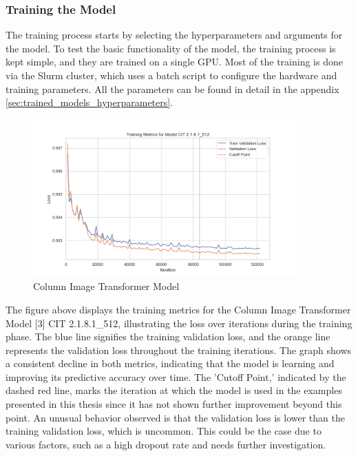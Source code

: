     \subsubsection{Training the Model}

    The training process starts by selecting the hyperparameters and arguments for the model. To test the basic functionality of the model, the training process is kept simple, and they are trained on a single GPU. Most of the training is done via the Slurm cluster, which uses a batch script to configure the hardware and training parameters. All the parameters can be found in detail in the appendix \autoref{sec:trained_models_hyperparameters}.
    
    \begin{figure}[H]
        \centering
        \includegraphics[width=0.9\textwidth]{imgs/Training_Metrics_CIT 2.1.8.1_512.png}
        \caption{Column Image Transformer Model}
        \label{fig:Training_Metrics_CIT512}
    \end{figure}

    The figure above displays the training metrics for the Column Image Transformer Model [3] CIT 2.1.8.1\_512, illustrating the loss over iterations during the training phase. The blue line signifies the training validation loss, and the orange line represents the validation loss throughout the training iterations. The graph shows a consistent decline in both metrics, indicating that the model is learning and improving its predictive accuracy over time. The 'Cutoff Point,' indicated by the dashed red line, marks the iteration at which the model is used in the examples presented in this thesis since it has not shown further improvement beyond this point. An unusual behavior observed is that the validation loss is lower than the training validation loss, which is uncommon. This could be the case due to various factors, such as a high dropout rate and needs further investigation.


